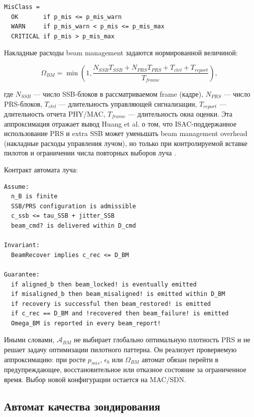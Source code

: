 \documentclass[12pt,a4paper]{article}
\begin{document}
\begin{verbatim}
MisClass =
  OK       if p_mis <= p_mis_warn
  WARN     if p_mis_warn < p_mis <= p_mis_max
  CRITICAL if p_mis > p_mis_max
\end{verbatim}

Накладные расходы beam management задаются нормированной величиной:

\begin{equation}
\Omega_{BM}=
\min\left(
1,
\frac{
N_{SSB}T_{SSB}+N_{PRS}T_{PRS}+T_{ctrl}+T_{report}
}
{T_{frame}}
\right),
\end{equation}

где $N_{SSB}$ --- число SSB-блоков в рассматриваемом frame (кадре), $N_{PRS}$ --- число PRS-блоков, $T_{ctrl}$ --- длительность управляющей сигнализации, $T_{report}$ --- длительность отчета PHY/MAC, $T_{frame}$ --- длительность окна оценки. Эта аппроксимация отражает вывод Huang et al. о том, что ISAC-поддержанное использование PRS и extra SSB может уменьшать beam management overhead (накладные расходы управления лучом), но только при контролируемой вставке пилотов и ограничении числа повторных выборов луча \cite{huang2026beam}.

Контракт автомата луча:

\begin{verbatim}
Assume:
  n_B is finite
  SSB/PRS configuration is admissible
  c_ssb <= tau_SSB + jitter_SSB
  beam_cmd? is delivered within D_cmd

Invariant:
  BeamRecover implies c_rec <= D_BM

Guarantee:
  if aligned_b then beam_locked! is eventually emitted
  if misaligned_b then beam_misaligned! is emitted within D_BM
  if recovery is successful then beam_restored! is emitted
  if c_rec == D_BM and !recovered then beam_failure! is emitted
  Omega_BM is reported in every beam_report!
\end{verbatim}

Иными словами, $\mathcal{A}_{BM}$ не выбирает глобально оптимальную плотность PRS и не решает задачу оптимизации пилотного паттерна. Он реализует проверяемую аппроксимацию: при росте $p_{mis}$, $\epsilon_b$ или $\Omega_{BM}$ автомат обязан перейти в предупреждающее, восстановительное или отказное состояние за ограниченное время. Выбор новой конфигурации остается на MAC/SDN.

\subsection{Автомат качества зондирования}
\end{document}
